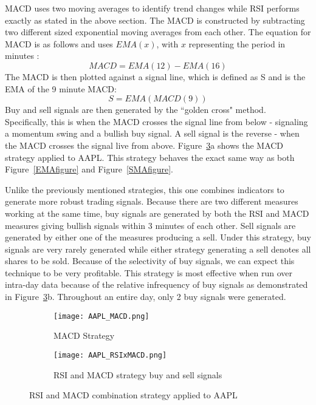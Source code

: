 \documentclass[../thesis.tex]{subfiles}
\begin{document}
MACD uses two moving averages to identify trend changes while RSI performs exactly as stated in the above section. The MACD is constructed by subtracting two different sized exponential moving averages from each other. The equation for MACD is as follows and uses $EMA(x)$, with $x$ representing the period in minutes \cite{Chong2014}: \[ MACD = EMA(12) - EMA(16)\] The MACD is then plotted against a signal line, which is defined as S and is the EMA of the 9 minute MACD: \[ S = EMA(MACD(9)) \] Buy and sell signals are then generated by the ``golden cross" method. Specifically, this is when the MACD crosses the signal line from below - signaling a momentum swing and a bullish buy signal. A sell signal is the reverse - when the MACD crosses the signal live from above. Figure~\ref{RSIMACDfigure}a shows the MACD strategy applied to AAPL. This strategy behaves the exact same way as both Figure~\ref{EMAfigure} and Figure~\ref{SMAfigure}.

Unlike the previously mentioned strategies, this one combines indicators to generate more robust trading signals. Because there are two different measures working at the same time, buy signals are generated by both the RSI and MACD measures giving bullish signals within 3 minutes of each other. Sell signals are generated by either one of the measures producing a sell. Under this strategy, buy signals are very rarely generated while either strategy generating a sell denotes all shares to be sold. Because of the selectivity of buy signals, we can expect this technique to be very profitable. This strategy is most effective when run over intra-day data because of the relative infrequency of buy signals as demonstrated in Figure~\ref{RSIMACDfigure}b. Throughout an entire day, only 2 buy signals were generated. 

\begin{figure}[h]
\centering

\begin{subfigure}[t]{0.45\textwidth}
\texttt{[image: AAPL\_MACD.png]}
\caption{MACD Strategy \label{overflow}}
\end{subfigure}
\begin{subfigure}[t]{0.45\textwidth}
\texttt{[image: AAPL\_RSIxMACD.png]}
\caption{RSI and MACD strategy buy and sell signals \label{overflow}}
\end{subfigure}

\caption{RSI and MACD combination strategy applied to AAPL  \label{overflow}}
\label{RSIMACDfigure}
\end{figure}
\end{document}
